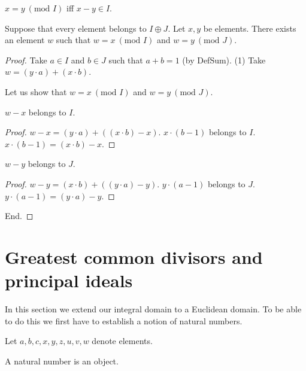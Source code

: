 \documentclass{article}
\renewcommand{\mod}{\text{mod }}
\begin{document}
  \begin{forthel}
    \begin{definition}\label{DefMod}
      $x = y ~(\mod I)$ iff $x - y \in I$.
    \end{definition}

    \begin{theorem}\label{ChineseRemainder}
      Suppose that every element belongs to $I \oplus J$.
      Let $x, y$ be elements.
      There exists an element $w$ such that $w = x ~(\mod I)$ and
      $w = y ~(\mod J)$.
    \end{theorem}
    \begin{proof}
      Take $a \in I$ and $b \in J$ such that $a + b = 1$ (by DefSum).
      (1) Take $w = (y \cdot a) + (x \cdot b)$.

      Let us show that $w = x ~(\mod I)$ and $w = y ~(\mod J)$.

        $w - x$ belongs to $I$.
        \begin{proof}
          $w - x = (y \cdot a) + ((x \cdot b) - x)$.
          $x \cdot (b - 1)$ belongs to $I$.
          $x \cdot (b - 1) = (x \cdot b) - x$.
        \end{proof}

        $w - y$ belongs to $J$.
        \begin{proof}
          $w - y = (x \cdot b) + ((y \cdot a) - y)$.
          $y \cdot (a - 1)$ belongs to $J$.
          $y \cdot (a - 1) = (y \cdot a) - y$.
        \end{proof}
      End.
    \end{proof}
  \end{forthel}


  \section{Greatest common divisors and principal ideals}

  In this section we extend our integral domain to a Euclidean domain. To be
  able to do this we first have to establish a notion of natural numbers.

  \begin{forthel}
    Let $a,b,c,x,y,z,u,v,w$ denote elements.

    \begin{signature}\label{NatSort}
      A natural number is an object.
    \end{signature}

  \end{forthel}
\end{document}
